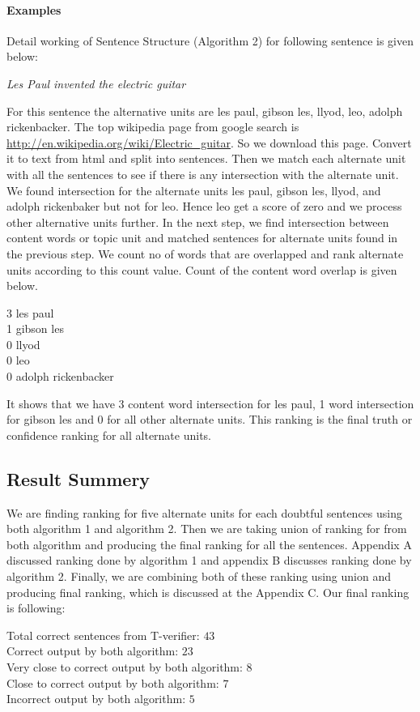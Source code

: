 \documentclass[12pt]{article}
\begin{document}
\paragraph{Examples}
Detail working of Sentence Structure (Algorithm 2) for following sentence is given below:

\emph{Les Paul invented the electric guitar}

For this sentence the alternative units are les paul, gibson les, llyod, leo, adolph rickenbacker. The top wikipedia page from google search is \url{http://en.wikipedia.org/wiki/Electric_guitar}. So we download this page. Convert it to text from html and split into sentences. Then we match each alternate unit with all the sentences to see if there is any intersection with the alternate unit. We found intersection for the alternate units les paul, gibson les, llyod, and adolph rickenbaker but not for leo. Hence leo get a score of zero and we process other alternative units further. In the next step, we find intersection between content words or topic unit and matched sentences for alternate units found in the previous step. We count no of words that are overlapped and rank alternate units according to this count value. Count of the content word overlap is given below.

3 les paul\\
1 gibson les\\
0 llyod\\
0 leo\\
0 adolph rickenbacker

 It shows that we have 3 content word intersection for les paul, 1 word intersection for gibson les and 0 for all other alternate units. This ranking is the final truth or confidence ranking for all alternate units. 
 
 
 \subsection{Result Summery}
 We are finding ranking for five alternate units for each doubtful sentences using both algorithm 1 and algorithm 2. Then we are taking union of ranking for from both algorithm and producing the final ranking for all the sentences. Appendix A discussed ranking done by algorithm 1 and appendix B discusses ranking done by algorithm 2. Finally, we are combining both of these ranking using union and producing final ranking, which is discussed at the Appendix C. Our final ranking is following:

Total correct sentences from T-verifier:  $43$ \\
Correct output by both algorithm:  $23$ \\
Very close to correct output by both algorithm:  $8$\\
Close to correct output by both algorithm:  $7$ \\
Incorrect output by both algorithm:  $5$ \\
\end{document}
